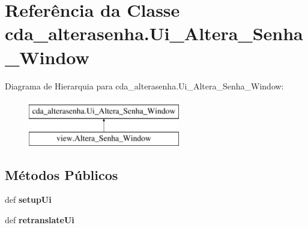 \hypertarget{classcda__alterasenha_1_1Ui__Altera__Senha__Window}{\section{\-Referência da \-Classe cda\-\_\-alterasenha.\-Ui\-\_\-\-Altera\-\_\-\-Senha\-\_\-\-Window}
\label{classcda__alterasenha_1_1Ui__Altera__Senha__Window}
}
\-Diagrama de \-Hierarquia para cda\-\_\-alterasenha.\-Ui\-\_\-\-Altera\-\_\-\-Senha\-\_\-\-Window\-:\begin{figure}[H]
\begin{center}
\leavevmode
\includegraphics[height=2.000000cm]{classcda__alterasenha_1_1Ui__Altera__Senha__Window}
\end{center}
\end{figure}
\subsection*{\-Métodos \-Públicos}
\begin{DoxyCompactItemize}
\item 
\hypertarget{classcda__alterasenha_1_1Ui__Altera__Senha__Window_a1e29e5f8a5053986a1e489dec61e4670}{def {\bfseries setup\-Ui}}\label{classcda__alterasenha_1_1Ui__Altera__Senha__Window_a1e29e5f8a5053986a1e489dec61e4670}

\item 
\hypertarget{classcda__alterasenha_1_1Ui__Altera__Senha__Window_ab8e41dbfed0a21210f0969d945908c84}{def {\bfseries retranslate\-Ui}}\label{classcda__alterasenha_1_1Ui__Altera__Senha__Window_ab8e41dbfed0a21210f0969d945908c84}

\end{DoxyCompactItemize}
